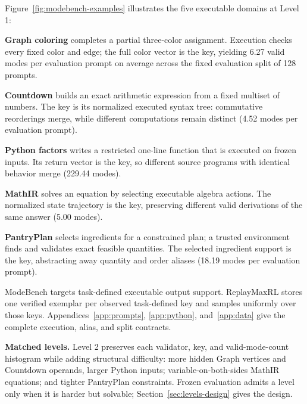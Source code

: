 \documentclass{article}
\newcommand{\1}{\mathbf 1}
\newcommand{\domlabel}[2]{\colorbox{#1}{\textbf{#2}}}
\theoremstyle{remark}
\theoremstyle{definition}
\theoremstyle{plain}
\begin{document}
Figure~\ref{fig:modebench-examples} illustrates the five executable domains at
Level 1:

\begin{list}{\textbullet}{%
  \setlength{\leftmargin}{1.35em}%
  \setlength{\labelwidth}{0.70em}%
  \setlength{\labelsep}{0.35em}%
  \setlength{\itemindent}{0pt}%
  \setlength{\listparindent}{0pt}%
  \setlength{\parsep}{0pt}%
  \setlength{\topsep}{0.3em}%
  \setlength{\itemsep}{0.25em}}
  \item \domlabel{domGraph}{Graph coloring} completes a partial three-color
  assignment. Execution checks every fixed color and edge; the full color
  vector is the key, yielding 6.27 valid modes per evaluation prompt on
  average across the fixed evaluation split of 128 prompts.

  \item \domlabel{domCountdown}{Countdown} builds an exact arithmetic
  expression from a fixed multiset of numbers. The key is its normalized
  executed syntax tree: commutative reorderings merge, while different
  computations remain distinct (4.52 modes per evaluation prompt).

  \item \domlabel{domPython}{Python factors} writes a restricted one-line
  function that is executed on frozen inputs. Its return vector is the key,
  so different source programs with identical behavior merge (229.44 modes).

  \item \domlabel{domMathIR}{MathIR} solves an equation by selecting
  executable algebra actions. The normalized state trajectory is the key,
  preserving different valid derivations of the same answer (5.00 modes).

  \item \domlabel{domPantry}{PantryPlan} selects ingredients for a constrained
  plan; a trusted environment finds and validates exact feasible quantities.
  The selected ingredient support is the key, abstracting away quantity and
  order aliases (18.19 modes per evaluation prompt).
\end{list}

ModeBench targets task-defined executable output support. ReplayMaxRL stores
one verified exemplar per observed task-defined key and samples uniformly over
those keys.
Appendices~\ref{app:prompts}, \ref{app:python}, and~\ref{app:data} give the
complete execution, alias, and split contracts.

\noindent\textbf{Matched levels.}
Level 2 preserves each validator, key, and valid-mode-count histogram while
adding structural difficulty: more hidden Graph vertices and Countdown operands, larger
Python inputs; variable-on-both-sides MathIR equations; and tighter PantryPlan
constraints. Frozen evaluation admits a level only when it is harder but
solvable; Section~\ref{sec:levels-design} gives the design.
\end{document}
